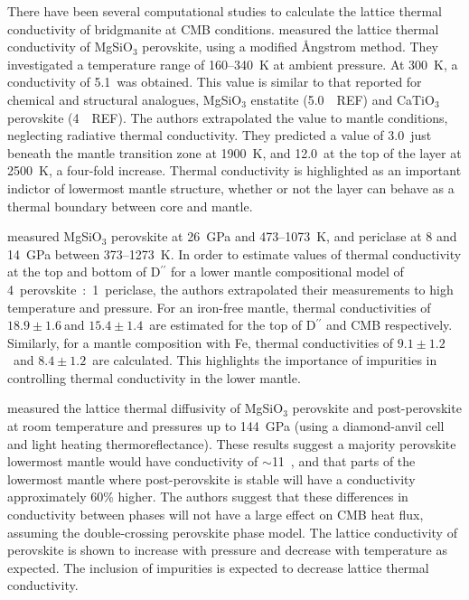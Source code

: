 There have been several computational studies to calculate the lattice thermal conductivity of bridgmanite at CMB conditions. \citet{Osako1991} measured the lattice thermal conductivity of MgSiO$_3$ perovskite, using a modified \AA ngstrom method. They investigated a temperature range of 160--340~K at ambient pressure. At 300~K, a conductivity of 5.1~\wmks was obtained. This value is similar to that reported for chemical and structural analogues, MgSiO$_3$ enstatite (5.0~\wmk~REF) and CaTiO$_{3}$ perovskite (4~\wmk~REF). The authors extrapolated the value to mantle conditions, neglecting radiative thermal conductivity. They predicted a value of 3.0~\wmks just beneath the mantle transition zone at 1900~K, and 12.0~\wmks at the top of the \ddds layer at 2500~K, a four-fold increase. Thermal conductivity is highlighted as an important indictor of lowermost mantle structure, whether or not the \ddds layer can behave as a thermal boundary between core and mantle.

\citet{Manthilake2011} measured MgSiO$_3$ perovskite at 26~GPa and 473--1073~K, and periclase at 8 and 14~GPa between 373--1273~K. In order to estimate values of thermal conductivity at the top and bottom of D$^{\prime \prime}$ for a lower mantle compositional model of 4~perovskite~:~1~periclase, the authors extrapolated their measurements to high temperature and pressure. For an iron-free mantle, thermal conductivities of $18.9\pm1.6~$\wmks and $15.4\pm1.4$~\wmks are estimated for the top of D$^{\prime \prime}$ and CMB respectively. Similarly, for a mantle composition with Fe, thermal conductivities of $9.1\pm1.2$~\wmks and $8.4\pm1.2$~\wmks are calculated. This highlights the importance of impurities in controlling thermal conductivity in the lower mantle.

\citet{Ohta2012} measured the lattice thermal diffusivity of MgSiO$_3$ perovskite and post-perovskite at room temperature and pressures up to 144~GPa (using a diamond-anvil cell and light heating thermoreflectance). These results suggest a majority perovskite lowermost mantle would have conductivity of $\sim$11~\wmk, and that parts of the lowermost mantle where post-perovskite is stable will have a conductivity approximately 60\% higher. The authors suggest that these differences in conductivity between phases will not have a large effect on CMB heat flux, assuming the double-crossing perovskite phase model. The lattice conductivity of \mgsios perovskite is shown to increase with pressure and decrease with temperature as expected. The inclusion of impurities is expected to decrease lattice thermal conductivity.

